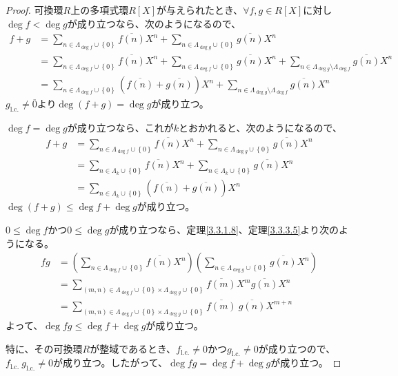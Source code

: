\documentclass[dvipdfmx]{jsarticle}
\begin{document}
\begin{proof}
可換環$R$上の多項式環$R[ X]$が与えられたとき、$\forall f,g \in R[ X]$に対し$\deg f < \deg g$が成り立つなら、次のようになるので、
\begin{align*}
f + g &= \sum_{n \in \varLambda_{\deg f} \cup \left\{ 0 \right\}} {\overline{f(n)}X^{n}} + \sum_{n \in \varLambda_{\deg g} \cup \left\{ 0 \right\}} {\overline{g(n)}X^{n}}\\
&= \sum_{n \in \varLambda_{\deg f} \cup \left\{ 0 \right\}} {\overline{f(n)}X^{n}} + \sum_{n \in \varLambda_{\deg f} \cup \left\{ 0 \right\}} {\overline{g(n)}X^{n}} + \sum_{n \in \varLambda_{\deg g} \setminus \varLambda_{\deg f}} {\overline{g(n)}X^{n}}\\
&= \sum_{n \in \varLambda_{\deg f} \cup \left\{ 0 \right\}} {\left( \overline{f(n)} + \overline{g(n)} \right)X^{n}} + \sum_{n \in \varLambda_{\deg g} \setminus \varLambda_{\deg f}} {\overline{g(n)}X^{n}}
\end{align*}
${g}_{\mathrm{l.c.}} \neq \overline{0}$より$\deg(f + g) = \deg g$が成り立つ。\par
$\deg f = \deg g$が成り立つなら、これが$k$とおかれると、次のようになるので、
\begin{align*}
f + g &= \sum_{n \in \varLambda_{\deg f} \cup \left\{ 0 \right\}} {\overline{f(n)}X^{n}} + \sum_{n \in \varLambda_{\deg g} \cup \left\{ 0 \right\}} {\overline{g(n)}X^{n}}\\
&= \sum_{n \in \varLambda_{k} \cup \left\{ 0 \right\}} {\overline{f(n)}X^{n}} + \sum_{n \in \varLambda_{k} \cup \left\{ 0 \right\}} {\overline{g(n)}X^{n}}\\
&= \sum_{n \in \varLambda_{k} \cup \left\{ 0 \right\}} {\left( \overline{f(n)} + \overline{g(n)} \right)X^{n}}
\end{align*}
$\deg(f + g) \leq \deg f + \deg g$が成り立つ。\par
$0 \leq \deg f$かつ$0 \leq \deg g$が成り立つなら、定理\ref{3.3.1.8}、定理\ref{3.3.3.5}より次のようになる。
\begin{align*}
fg &= \left( \sum_{n \in \varLambda_{\deg f} \cup \left\{ 0 \right\}} {\overline{f(n)}X^{n}} \right)\left( \sum_{n \in \varLambda_{\deg g} \cup \left\{ 0 \right\}} {\overline{g(n)}X^{n}} \right)\\
&= \sum_{(m,n) \in \varLambda_{\deg f} \cup \left\{ 0 \right\} \times \varLambda_{\deg g} \cup \left\{ 0 \right\}} {\overline{f(m)}X^{m}\overline{g(n)}X^{n}}\\
&= \sum_{(m,n) \in \varLambda_{\deg f} \cup \left\{ 0 \right\} \times \varLambda_{\deg g} \cup \left\{ 0 \right\}} {\overline{f(m)}\ \overline{g(n)}X^{m + n}}
\end{align*}
よって、$\deg{fg} \leq \deg f + \deg g$が成り立つ。\par
特に、その可換環$R$が整域であるとき、${f}_{\mathrm{l.c.}} \neq 0$かつ${g}_{\mathrm{l.c.}} \neq 0$が成り立つので、${f}_{\mathrm{l.c.}}\ {g}_{\mathrm{l.c.}} \neq 0$が成り立つ。したがって、$\deg{fg} = \deg f + \deg g$が成り立つ。
\end{proof}
\end{document}
